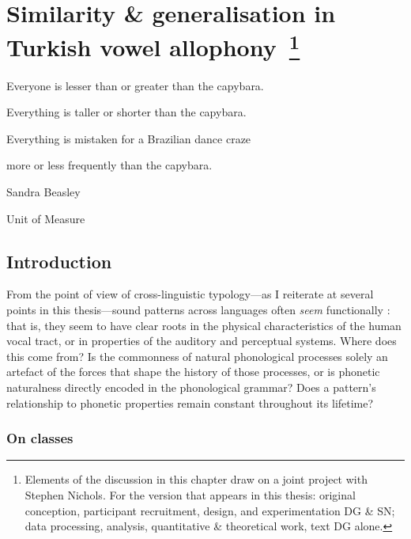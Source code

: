 \chapter[Similarity \& generalisation in Turkish vowel allophony]{Similarity \& generalisation in Turkish vowel allophony{\protect\large \ \footnote{Elements of the discussion in this chapter draw on a joint project with Stephen Nichols. For the version that appears in this thesis: original conception, participant recruitment, design, and experimentation DG
\& SN; data processing, analysis, quantitative \& theoretical work, text DG alone.}}}\label{chapter:turkish}

\epigraph{\singlespacing
Everyone is lesser than or greater than the capybara.

Everything is taller or shorter than the capybara.

Everything is mistaken for a Brazilian dance craze

more or less frequently than the capybara.}{Sandra Beasley}{Unit of Measure}

\section{Introduction}

From the point of view of cross-linguistic typology---as I reiterate at several points in this thesis---sound patterns across languages often \emph{seem} functionally : that is, they seem to have clear roots in the physical characteristics of the human vocal tract, or in properties of the auditory and perceptual systems. Where does this come from? Is the commonness of natural phonological processes solely an artefact of the forces that shape the history of those processes, or is phonetic naturalness directly encoded in the phonological grammar? Does a pattern's relationship to phonetic properties remain constant throughout its lifetime?

\subsection{On classes}\label{s:tr_introduction}

